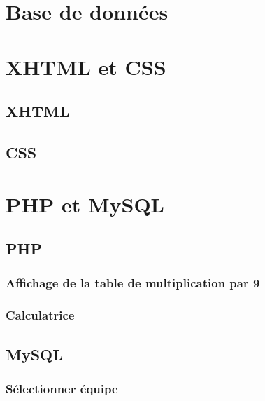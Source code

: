 \documentclass[12pt,a4paper,openany]{book}
\begin{document}
	\setcounter{tocdepth}{2}
	\setcounter{secnumdepth}{3}
	\maketitle
	\tableofcontents
	\part{Base de données}
	
	
	\part{XHTML et CSS}
	\chapter{XHTML}
	
	
	
	\chapter{CSS}
	\part{PHP et MySQL}
	\chapter{PHP}
	\section{Affichage de la table de multiplication par 9}
	
	
	\section{Calculatrice}
	
	
	\chapter{MySQL}
	\section{Sélectionner équipe}
	
\end{document}

